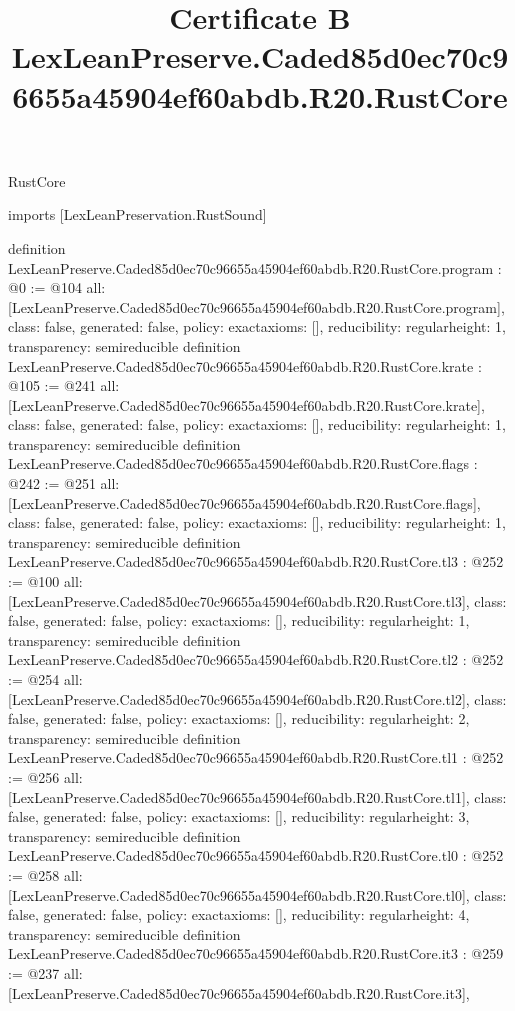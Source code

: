 \begin{lexlean}{RustCore}
\title{Certificate B LexLeanPreserve.Caded85d0ec70c96655a45904ef60abdb.R20.RustCore}
\begin{coremodule}
imports [LexLeanPreservation.RustSound]

definition LexLeanPreserve.Caded85d0ec70c96655a45904ef60abdb.R20.RustCore.program : @0 := @104 {
  all: [LexLeanPreserve.Caded85d0ec70c96655a45904ef60abdb.R20.RustCore.program],
  class: false,
  generated: false,
  policy: exact{axioms: []},
  reducibility: regular{height: 1},
  transparency: semireducible
}
definition LexLeanPreserve.Caded85d0ec70c96655a45904ef60abdb.R20.RustCore.krate : @105 := @241 {
  all: [LexLeanPreserve.Caded85d0ec70c96655a45904ef60abdb.R20.RustCore.krate],
  class: false,
  generated: false,
  policy: exact{axioms: []},
  reducibility: regular{height: 1},
  transparency: semireducible
}
definition LexLeanPreserve.Caded85d0ec70c96655a45904ef60abdb.R20.RustCore.flags : @242 := @251 {
  all: [LexLeanPreserve.Caded85d0ec70c96655a45904ef60abdb.R20.RustCore.flags],
  class: false,
  generated: false,
  policy: exact{axioms: []},
  reducibility: regular{height: 1},
  transparency: semireducible
}
definition LexLeanPreserve.Caded85d0ec70c96655a45904ef60abdb.R20.RustCore.tl3 : @252 := @100 {
  all: [LexLeanPreserve.Caded85d0ec70c96655a45904ef60abdb.R20.RustCore.tl3],
  class: false,
  generated: false,
  policy: exact{axioms: []},
  reducibility: regular{height: 1},
  transparency: semireducible
}
definition LexLeanPreserve.Caded85d0ec70c96655a45904ef60abdb.R20.RustCore.tl2 : @252 := @254 {
  all: [LexLeanPreserve.Caded85d0ec70c96655a45904ef60abdb.R20.RustCore.tl2],
  class: false,
  generated: false,
  policy: exact{axioms: []},
  reducibility: regular{height: 2},
  transparency: semireducible
}
definition LexLeanPreserve.Caded85d0ec70c96655a45904ef60abdb.R20.RustCore.tl1 : @252 := @256 {
  all: [LexLeanPreserve.Caded85d0ec70c96655a45904ef60abdb.R20.RustCore.tl1],
  class: false,
  generated: false,
  policy: exact{axioms: []},
  reducibility: regular{height: 3},
  transparency: semireducible
}
definition LexLeanPreserve.Caded85d0ec70c96655a45904ef60abdb.R20.RustCore.tl0 : @252 := @258 {
  all: [LexLeanPreserve.Caded85d0ec70c96655a45904ef60abdb.R20.RustCore.tl0],
  class: false,
  generated: false,
  policy: exact{axioms: []},
  reducibility: regular{height: 4},
  transparency: semireducible
}
definition LexLeanPreserve.Caded85d0ec70c96655a45904ef60abdb.R20.RustCore.it3 : @259 := @237 {
  all: [LexLeanPreserve.Caded85d0ec70c96655a45904ef60abdb.R20.RustCore.it3],
}
\end{coremodule}
\end{lexlean}
